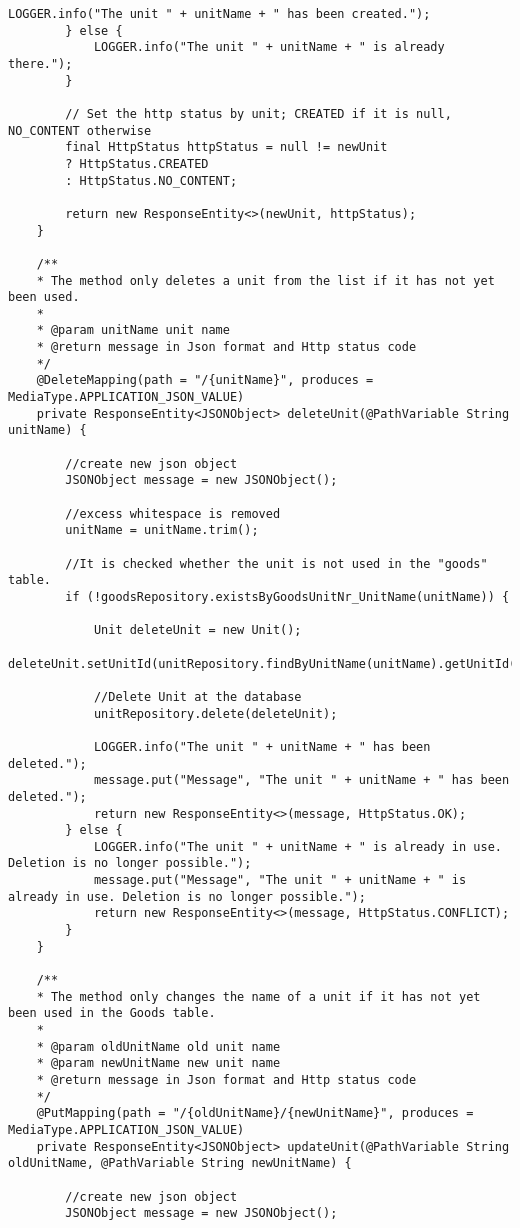 \begin{lstlisting}[frame=tb, caption={Das Listing zeigt die Klasse UnitController im Paket controller}, label={lst:UnitController}]
			LOGGER.info("The unit " + unitName + " has been created.");
		} else {
			LOGGER.info("The unit " + unitName + " is already there.");
		}
		
		// Set the http status by unit; CREATED if it is null, NO_CONTENT otherwise
		final HttpStatus httpStatus = null != newUnit
		? HttpStatus.CREATED
		: HttpStatus.NO_CONTENT;
		
		return new ResponseEntity<>(newUnit, httpStatus);
	}
	
	/**
	* The method only deletes a unit from the list if it has not yet been used.
	*
	* @param unitName unit name
	* @return message in Json format and Http status code
	*/
	@DeleteMapping(path = "/{unitName}", produces = MediaType.APPLICATION_JSON_VALUE)
	private ResponseEntity<JSONObject> deleteUnit(@PathVariable String unitName) {
		
		//create new json object
		JSONObject message = new JSONObject();
		
		//excess whitespace is removed
		unitName = unitName.trim();
		
		//It is checked whether the unit is not used in the "goods" table.
		if (!goodsRepository.existsByGoodsUnitNr_UnitName(unitName)) {
			
			Unit deleteUnit = new Unit();
			deleteUnit.setUnitId(unitRepository.findByUnitName(unitName).getUnitId());
			
			//Delete Unit at the database
			unitRepository.delete(deleteUnit);
			
			LOGGER.info("The unit " + unitName + " has been deleted.");
			message.put("Message", "The unit " + unitName + " has been deleted.");
			return new ResponseEntity<>(message, HttpStatus.OK);
		} else {
			LOGGER.info("The unit " + unitName + " is already in use. Deletion is no longer possible.");
			message.put("Message", "The unit " + unitName + " is already in use. Deletion is no longer possible.");
			return new ResponseEntity<>(message, HttpStatus.CONFLICT);
		}
	}
	
	/**
	* The method only changes the name of a unit if it has not yet been used in the Goods table.
	*
	* @param oldUnitName old unit name
	* @param newUnitName new unit name
	* @return message in Json format and Http status code
	*/
	@PutMapping(path = "/{oldUnitName}/{newUnitName}", produces = MediaType.APPLICATION_JSON_VALUE)
	private ResponseEntity<JSONObject> updateUnit(@PathVariable String oldUnitName, @PathVariable String newUnitName) {
		
		//create new json object
		JSONObject message = new JSONObject();
		

\end{lstlisting}
